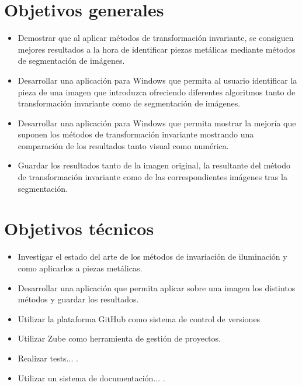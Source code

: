 

\section{Objetivos generales}\label{objetivos-generales}

\begin{itemize}
    \tightlist
        \item
            Demostrar que al aplicar métodos de transformación invariante, se consiguen mejores resultados a la hora de identificar piezas metálicas mediante métodos de segmentación de imágenes.
        \item
            Desarrollar una aplicación para Windows que permita al usuario identificar la pieza de una imagen que introduzca ofreciendo diferentes algoritmos tanto de transformación invariante como de segmentación de imágenes.
        \item
            Desarrollar una aplicación para Windows que permita mostrar la mejoría que suponen los métodos de transformación invariante mostrando una comparación de los resultados tanto visual como numérica.
        \item
            Guardar los resultados tanto de la imagen original, la resultante del método de transformación invariante como de las correspondientes imágenes tras la segmentación.
\end{itemize}

\section{Objetivos técnicos}\label{objetivos-tecnicos}

\begin{itemize}
    \tightlist
        \item
            Investigar el estado del arte de los métodos de invariación de iluminación y como aplicarlos a piezas metálicas.
        \item
            Desarrollar una aplicación que permita aplicar sobre una imagen los distintos métodos y guardar los resultados.
        \item
            Utilizar la plataforma GitHub como sistema de control de versiones
        \item
            Utilizar Zube como herramienta de gestión de proyectos.
        \item
            Realizar tests... .
        \item
            Utilizar un sistema de documentación... .
\end{itemize}

